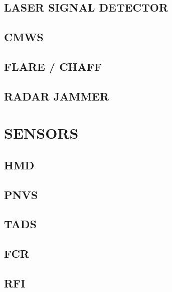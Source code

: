 \documentclass[fontHelvetica]{TechCheck}
\begin{document}
	\clearpage 

	\section{LASER SIGNAL DETECTOR}

	\clearpage 

	\section{CMWS}

	\clearpage 

	\section{FLARE / CHAFF}

	\clearpage 

	\section{RADAR JAMMER}

	\cleardoublepage
	

	\chapter{SENSORS}
	\minitoc
	\cleardoublepage

	\section{HMD}

	\clearpage 

	\section{PNVS}

	\clearpage

	\section{TADS}

	\clearpage

	\section{FCR}

	\clearpage 

	\section{RFI}
\end{document}
